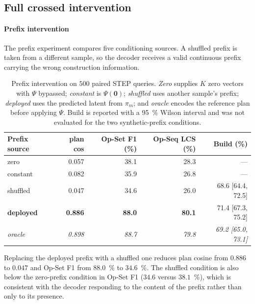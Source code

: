 \documentclass[preprint,12pt]{elsarticle}
\begin{document}
\subsection{Full crossed intervention}
\label{app:crossed}

\paragraph{Prefix intervention}
The prefix experiment compares five conditioning sources. A shuffled prefix is taken from a
different sample, so the decoder receives a valid continuous prefix carrying the wrong
construction information.

\begin{table}[htbp]
  \centering
  \footnotesize
  \caption{Prefix intervention on $500$ paired STEP queries. \emph{Zero} supplies $K$ zero
    vectors with $\Psi$ bypassed; \emph{constant} is $\Psi(\mathbf{0})$; \emph{shuffled} uses
    another sample's prefix; \emph{deployed} uses the predicted latent from $\pi_m$; and
    \emph{oracle} encodes the reference plan before applying $\Psi$. Build is reported with a
    95~\% Wilson interval and was not evaluated for the two synthetic-prefix conditions.}
  \label{tab:ablation_prefix}
  \begin{tabular}{lrrrr}
    \toprule
    Prefix source     & plan cos       & Op-Set F1 (\%) & Op-Seq LCS (\%) & Build (\%)               \\
    \midrule
    zero              & 0.057          & 38.1           & 28.3            & ---                      \\
    constant          & 0.082          & 35.9           & 26.8            & ---                      \\
    shuffled          & 0.047          & 34.6           & 26.0            & 68.6 [64.4, 72.5]        \\
    \textbf{deployed} & \textbf{0.886} & \textbf{88.0}  & \textbf{80.1}   & 71.4 [67.3, 75.2]        \\
    \emph{oracle}     & \emph{0.898}   & \emph{88.7}    & \emph{79.8}     & \emph{69.2 [65.0, 73.1]} \\
    \bottomrule
  \end{tabular}
\end{table}

Replacing the deployed prefix with a shuffled one reduces plan cosine from $0.886$ to
$0.047$ and Op-Set F1 from $88.0$~\% to $34.6$~\%. The shuffled condition is also below the
zero-prefix condition in Op-Set F1 ($34.6$ versus $38.1$~\%), which is consistent with the
decoder responding to the content of the prefix rather than only to its presence.
\end{document}
